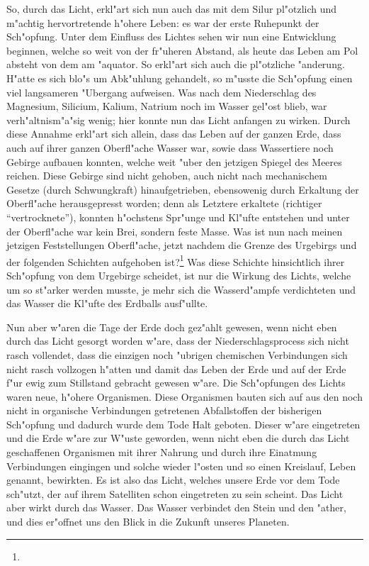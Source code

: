 \documentclass[a4paper, 11pt, oneside]{article}
\begin{document}
So, durch das Licht, erkl"art sich nun auch das mit dem Silur pl"otzlich und m"achtig hervortretende h"ohere Leben: es war der erste Ruhepunkt der Sch"opfung. Unter dem Einfluss des Lichtes sehen wir nun eine Entwicklung beginnen, welche so weit von der fr"uheren Abstand, als heute das Leben am Pol absteht von dem am "aquator. So erkl"art sich auch die pl"otzliche "anderung. H"atte es sich blo"s um Abk"uhlung gehandelt, so m"usste die Sch"opfung einen viel langsameren "Ubergang aufweisen. Was nach dem Niederschlag des Magnesium, Silicium, Kalium, Natrium noch im Wasser gel"ost blieb, war verh"altnism"a"sig wenig; hier konnte nun das Licht anfangen zu wirken. Durch diese Annahme erkl"art sich allein, dass das Leben auf der ganzen Erde, dass auch auf ihrer ganzen Oberfl"ache Wasser war, sowie dass Wassertiere noch Gebirge aufbauen konnten, welche weit "uber den jetzigen Spiegel des Meeres reichen. Diese Gebirge sind nicht gehoben, auch nicht nach mechanischem Gesetze (durch Schwungkraft) hinaufgetrieben, ebensowenig durch Erkaltung der Oberfl"ache herausgepresst worden; denn als Letztere erkaltete (richtiger "`vertrocknete"'), konnten h"ochstens Spr"unge und Kl"ufte entstehen und unter der Oberfl"ache war kein Brei, sondern feste Masse. Was ist nun nach meinen jetzigen Feststellungen Oberfl"ache, jetzt nachdem die Grenze des Urgebirgs und der folgenden Schichten aufgehoben ist?\footnote{} Was diese Schichte hinsichtlich ihrer Sch"opfung von dem Urgebirge scheidet, ist nur die Wirkung des Lichts, welche um so st"arker werden musste, je mehr sich die Wasserd"ampfe verdichteten und das Wasser die Kl"ufte des Erdballs ausf"ullte.

Nun aber w"aren die Tage der Erde doch gez"ahlt gewesen, wenn nicht eben durch das Licht gesorgt worden w"are, dass der Niederschlagsprocess sich nicht rasch vollendet, dass die einzigen noch "ubrigen chemischen Verbindungen sich nicht rasch vollzogen h"atten und damit das Leben der Erde und auf der Erde f"ur ewig zum Stillstand gebracht gewesen w"are. Die Sch"opfungen des Lichts waren neue, h"ohere Organismen. Diese Organismen bauten sich auf aus den noch nicht in organische Verbindungen getretenen Abfallstoffen der bisherigen Sch"opfung und dadurch wurde dem Tode Halt geboten. Dieser w"are eingetreten und die Erde w"are zur W"uste geworden, wenn nicht eben die durch das Licht geschaffenen Organismen mit ihrer Nahrung und durch ihre Einatmung Verbindungen eingingen und solche wieder l"osten und so einen Kreislauf, Leben genannt, bewirkten. Es ist also das Licht, welches unsere Erde vor dem Tode sch"utzt, der auf ihrem Satelliten schon eingetreten zu sein scheint. Das Licht aber wirkt durch das Wasser. Das Wasser verbindet den Stein und den "ather, und dies er"offnet uns den Blick in die Zukunft unseres Planeten.
\clearpage
\end{document}
